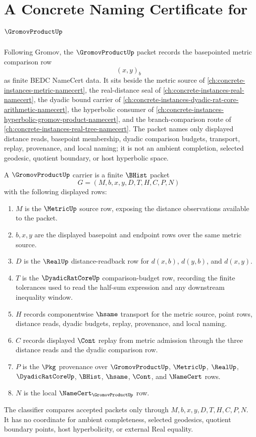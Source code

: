 \chapter{A Concrete Naming Certificate for $\GromovProductUp$}
\label{ch:concrete-instances-gromov-product-namecert}

Following Gromov, the $\GromovProductUp$ packet records the basepointed metric comparison row
$$
(x,y)_b
$$
as finite BEDC NameCert data. It sits beside the metric source of \autoref{ch:concrete-instances-metric-namecert}, the real-distance seal of \autoref{ch:concrete-instances-real-namecert}, the dyadic bound carrier of \autoref{ch:concrete-instances-dyadic-rat-core-arithmetic-namecert}, the hyperbolic consumer of \autoref{ch:concrete-instances-hyperbolic-gromov-product-namecert}, and the branch-comparison route of \autoref{ch:concrete-instances-real-tree-namecert}. The packet names only displayed distance reads, basepoint membership, dyadic comparison budgets, transport, replay, provenance, and local naming; it is not an ambient completion, selected geodesic, quotient boundary, or host hyperbolic space.

\begin{definition}
\label{def:gromov-product-carrier}
A $\GromovProductUp$ carrier is a finite $\BHist$ packet
$$
G=(M,b,x,y,D,T,H,C,P,N)
$$
with the following displayed rows:
\begin{enumerate}
\item $M$ is the $\MetricUp$ source row, exposing the distance observations available to the packet.
\item $b,x,y$ are the displayed basepoint and endpoint rows over the same metric source.
\item $D$ is the $\RealUp$ distance-readback row for $d(x,b)$, $d(y,b)$, and $d(x,y)$.
\item $T$ is the $\DyadicRatCoreUp$ comparison-budget row, recording the finite tolerances used to read the half-sum expression and any downstream inequality window.
\item $H$ records componentwise $\hsame$ transport for the metric source, point rows, distance reads, dyadic budgets, replay, provenance, and local naming.
\item $C$ records displayed $\Cont$ replay from metric admission through the three distance reads and the dyadic comparison row.
\item $P$ is the $\Pkg$ provenance over $\GromovProductUp$, $\MetricUp$, $\RealUp$, $\DyadicRatCoreUp$, $\BHist$, $\hsame$, $\Cont$, and $\NameCert$ rows.
\item $N$ is the local $\NameCert_{\GromovProductUp}$ row.
\end{enumerate}
The classifier compares accepted packets only through $M,b,x,y,D,T,H,C,P,N$. It has no coordinate for ambient completeness, selected geodesics, quotient boundary points, host hyperbolicity, or external Real equality.
\end{definition}

